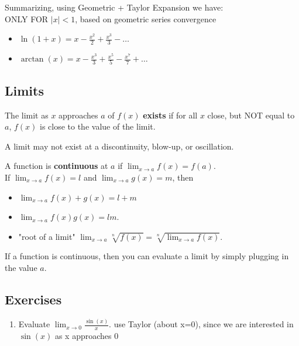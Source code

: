 \documentclass[a4paper, 12pt]{article}
\newcommand{\bt}[1]{\textbf{#1}} %
\newcommand{\green}[1]{\textcolor{javagreen}{#1}} %
\newcommand{\gray}[1]{\textcolor[gray]{0.5}{#1}} %
\begin{document}
Summarizing, using Geometric + Taylor Expansion we have: \\
ONLY FOR $|x|<1$, based on geometric series convergence
\begin{itemize}
    \item $\displaystyle \ln(1+x) = x - \frac{x^2}{2} + \frac{x^3}{3} - \dots$ 
    \item $\displaystyle \arctan(x) = x - \frac{x^3}{3} + \frac{x^5}{5} -
    \frac{x^7}{7} + \dots$ 
\end{itemize}



\subsection{Limits}

The limit as $x$ approaches $a$ of $f(x)$ \bt{exists} if for all $x$ close, but NOT equal to $a$, $f(x)$ is close to the value of the limit.

A limit may not exist at a discontinuity, blow-up, or oscillation.

A function is \bt{continuous} at $a$ if $\lim_{x \rightarrow a} f(x) = f(a)$.\\

If $\lim_{x \rightarrow a} f(x) = l$ and $\lim_{x \rightarrow a} g(x) = m$, then
\begin{itemize}
    \item $\displaystyle \lim_{x \rightarrow a}f(x) + g(x) = l + m$
    \item $\displaystyle \lim_{x \rightarrow a} f(x)g(x) = lm.$
    \item "root of a limit" $\displaystyle \lim_{x \rightarrow a} \sqrt[n]{f(x)} 
    = \sqrt[n]{\lim_{x \rightarrow a} f(x)}$.
\end{itemize}

If a function is continuous, then you can evaluate a limit by simply plugging in the value $a$.

\subsection*{\green{Exercises}}

\begin{enumerate}
    \item Evaluate $\displaystyle \lim_{x \rightarrow 0} \frac{\sin(x)}{x}$.
    \gray{
    use Taylor (about x=0), since we are interested in $\sin(x)$ as x approaches 0
    }
\end{enumerate}
\end{document}
